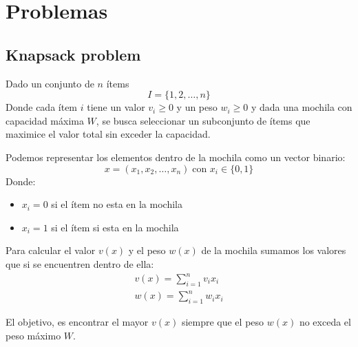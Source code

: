 \documentclass[12pt,twoside]{article}
\begin{document}
	\clearpage
	\section{Problemas}
	
	\subsection{Knapsack problem}
	
	Dado un conjunto de $n$ ítems \[I = \{1,2, \dots, n \}\] Donde cada ítem $i$ tiene un valor $v_i \geq 0$ y un peso $w_i \geq 0$ y dada una mochila con capacidad máxima $W$, se busca seleccionar un subconjunto de ítems que maximice el valor total sin exceder la capacidad.
	
	Podemos representar los elementos dentro de la mochila como un vector binario: 
	\[ x = (x_1, x_2, \dots , x_n) \; \text{con } x_i \in \{0, 1\} \]
	Donde:
	\begin{itemize}
		\item $x_i = 0$ si el ítem no esta en la mochila
		\item $x_i = 1$ si el ítem si esta en la mochila
	\end{itemize}
	
	Para calcular el valor $v(x)$ y el peso $w(x)$ de la mochila sumamos los valores que si se encuentren dentro de ella:
	\begin{gather*}
		v(x) = \sum_{i = 1}^{n} v_i x_i \\
		w(x) = \sum_{i = 1}^{n} w_i x_i 
	\end{gather*}
	
	El objetivo, es encontrar el mayor $v(x)$ siempre que el peso $w(x)$ no exceda el peso máximo $W$. 
	
\end{document}
